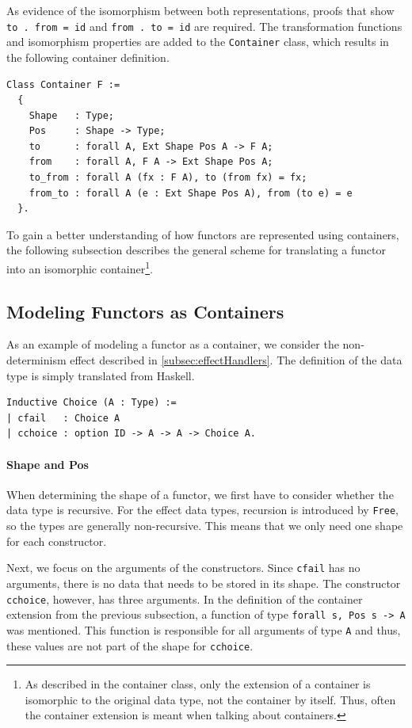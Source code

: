\documentclass[a4paper, 11pt, fleqn, twoside, abstract=on]{scrreprt}
\newcommand{\hinl}[1]{\texttt{#1}}
\newcommand{\cinl}[1]{\texttt{#1}}
\begin{document}
As evidence of the isomorphism between both representations, proofs that show \cinl{to . from = id} and \hinl{from . to = id} are required.
The transformation functions and isomorphism properties are added to the \cinl{Container} class, which results in the following container definition.

\begin{verbatim}
Class Container F :=
  {
    Shape   : Type;
    Pos     : Shape -> Type;
    to      : forall A, Ext Shape Pos A -> F A;
    from    : forall A, F A -> Ext Shape Pos A;
    to_from : forall A (fx : F A), to (from fx) = fx;
    from_to : forall A (e : Ext Shape Pos A), from (to e) = e
  }.
\end{verbatim}

To gain a better understanding of how functors are represented using containers, the following subsection describes the general scheme for translating a functor into an isomorphic container\footnote{As described in the container class, only the extension of a container is isomorphic to the original data type, not the container by itself. Thus, often the container extension is meant when talking about containers.}.

\subsection{Modeling Functors as Containers}
As an example of modeling a functor as a container, we consider the non-determinism effect described in \autoref{subsec:effectHandlers}.
The definition of the data type is simply translated from Haskell.

\begin{verbatim}
Inductive Choice (A : Type) :=
| cfail   : Choice A
| cchoice : option ID -> A -> A -> Choice A.
\end{verbatim}

\paragraph{Shape and Pos}
When determining the shape of a functor, we first have to consider whether the data type is recursive.
For the effect data types, recursion is introduced by \cinl{Free}, so the types are generally non-recursive.
This means that we only need one shape for each constructor.

Next, we focus on the arguments of the constructors.
Since \cinl{cfail} has no arguments, there is no data that needs to be stored in its shape.
The constructor \cinl{cchoice}, however, has three arguments.
In the definition of the container extension from the previous subsection, a function of type \cinl{forall s, Pos s -> A} was mentioned.
This function is responsible for all arguments of type \cinl{A} and thus, these values are not part of the shape for \cinl{cchoice}.
\end{document}
